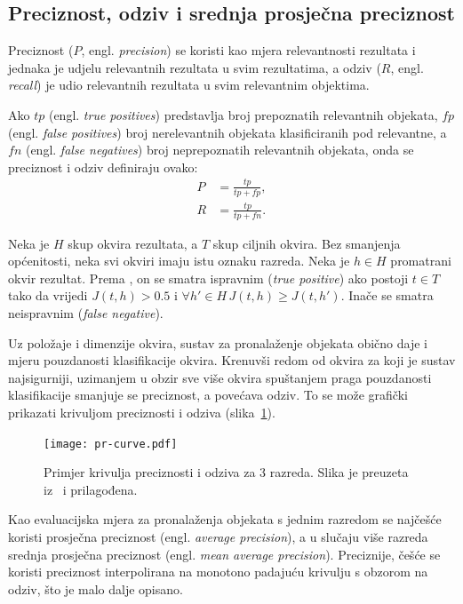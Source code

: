 \documentclass[utf8, seminar, numeric, lmodern]{feri}
\begin{document}
\subsection{Preciznost, odziv i srednja prosječna preciznost}

Preciznost ($P$, engl. \emph{precision}) se koristi kao mjera relevantnosti rezultata i jednaka je udjelu relevantnih rezultata u svim rezultatima, a odziv ($R$, engl. \emph{recall}) je udio relevantnih rezultata u svim relevantnim objektima. 

Ako $\mathit{tp}$ (engl. \emph{true positives}) predstavlja broj prepoznatih relevantnih objekata, $\mathit{fp}$ (engl. \emph{false positives}) broj nerelevantnih objekata klasificiranih pod relevantne, a $\mathit{fn}$  (engl. \emph{false negatives}) broj neprepoznatih relevantnih objekata, onda se preciznost i odziv definiraju ovako:
\begin{align}
P &= \frac{\mathit{tp}}{\mathit{tp} + \mathit{fp}}, \\
R &= \frac{\mathit{tp}}{\mathit{tp} + \mathit{fn}}.
\end{align}

Neka je $H$ skup okvira rezultata, a $T$ skup ciljnih okvira. Bez smanjenja općenitosti, neka svi okviri imaju istu oznaku razreda. Neka je $h \in H$ promatrani okvir rezultat. Prema \cite{pascalVOC-devkit}, on se smatra ispravnim (\emph{true positive}) ako postoji $t\in T$ tako da vrijedi $J(t,h) > 0.5$ i $\forall h'\in H \, J(t, h) \geq J(t, h')$. Inače se smatra neispravnim (\emph{false negative}).

Uz položaje i dimenzije okvira, sustav za pronalaženje objekata obično daje i mjeru pouzdanosti klasifikacije okvira. Krenuvši redom od okvira za koji je sustav najsigurniji, uzimanjem u obzir sve više okvira spuštanjem praga pouzdanosti klasifikacije smanjuje se preciznost, a povećava odziv. To se može grafički prikazati krivuljom preciznosti i odziva (slika~\ref{fig:pr-krivulja}).

\begin{figure}[htbp] \centering
	\texttt{[image: pr-curve.pdf]}
	\caption{Primjer krivulja preciznosti i odziva za $3$ razreda. Slika je preuzeta iz~\cite{prec-rec} i prilagođena.}
	\label{fig:pr-krivulja}
\end{figure}

Kao evaluacijska mjera za pronalaženja objekata s jednim razredom se najčešće koristi prosječna preciznost (engl. \emph{average precision}), a u slučaju više razreda srednja prosječna preciznost (engl. \emph{mean average precision}). Preciznije, češće se koristi preciznost interpolirana na monotono padajuću krivulju s obzorom na odziv, što je malo dalje opisano.
\end{document}

